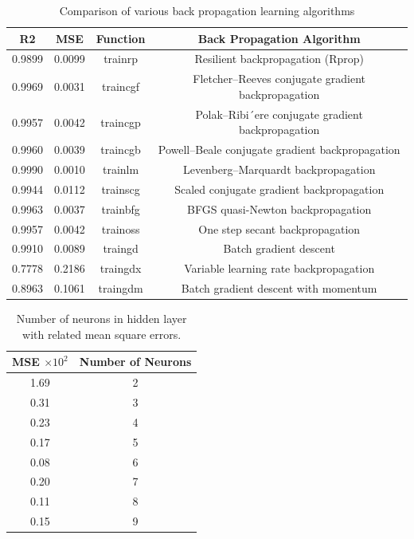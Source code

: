\documentclass{article}
\begin{document}
\begin{table}[htbp]
	\centering
	\caption{Comparison of various back propagation learning algorithms}
	\begin{tabular}{cccc}
		\hline
		R2 & MSE & Function & Back Propagation Algorithm \\
		\hline
		0.9899 & 0.0099 & trainrp & Resilient backpropagation (Rprop) \\
		0.9969 & 0.0031 & traincgf & Fletcher–Reeves conjugate gradient backpropagation \\
		0.9957 & 0.0042 & traincgp & Polak–Ribi´ere conjugate gradient backpropagation \\
		0.9960 & 0.0039 & traincgb & Powell–Beale conjugate gradient backpropagation \\
		0.9990 & 0.0010 & trainlm & Levenberg–Marquardt backpropagation \\
		0.9944 & 0.0112 & trainscg & Scaled conjugate gradient backpropagation \\
		0.9963 & 0.0037 & trainbfg & BFGS quasi-Newton backpropagation \\
		0.9957 & 0.0042 & trainoss & One step secant backpropagation \\
		0.9910 & 0.0089 & traingd & Batch gradient descent \\
		0.7778 & 0.2186 & traingdx & Variable learning rate backpropagation \\
		0.8963 & 0.1061 & traingdm & Batch gradient descent with momentum \\
		\hline
	\end{tabular}
\end{table}


\begin{table}[htbp]
	\centering
	\caption{Number of neurons in hidden layer with related mean square errors.}
	\begin{tabular}{cc}
		\hline
		MSE $\times 10^2$ & Number of Neurons \\
		\hline
		1.69 & 2 \\
		0.31 & 3 \\
		0.23 & 4 \\
		0.17 & 5 \\
		0.08 & 6 \\
		0.20 & 7 \\
		0.11 & 8 \\
		0.15 & 9 \\
		\hline
	\end{tabular}
\end{table}
\end{document}
